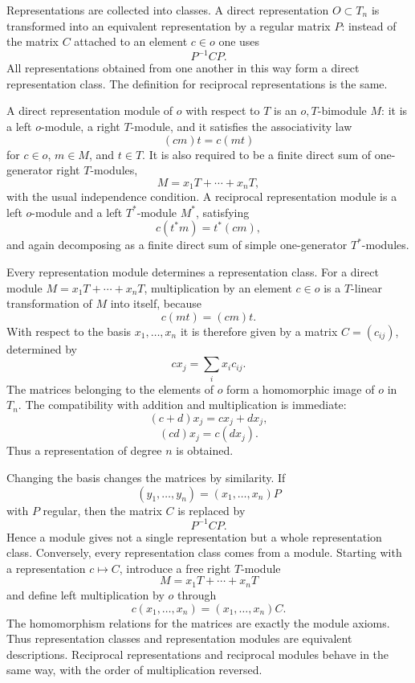 \documentclass[11pt]{article}
\begin{document}
Representations are collected into classes. A direct representation \(O\subset T_n\) is transformed into an equivalent representation by a regular matrix \(P\): instead of the matrix \(C\) attached to an element \(c\in o\) one uses
\[
  P^{-1}CP.
\]
All representations obtained from one another in this way form a direct representation class. The definition for reciprocal representations is the same.

A direct representation module of \(o\) with respect to \(T\) is an \(o,T\)-bimodule \(M\): it is a left \(o\)-module, a right \(T\)-module, and it satisfies the associativity law
\[
  (cm)t=c(mt)
\]
for \(c\in o\), \(m\in M\), and \(t\in T\). It is also required to be a finite direct sum of one-generator right \(T\)-modules,
\[
  M=x_1T+\cdots+x_nT,
\]
with the usual independence condition. A reciprocal representation module is a left \(o\)-module and a left \(T^*\)-module \(M^*\), satisfying
\[
  c(t^*m)=t^*(cm),
\]
and again decomposing as a finite direct sum of simple one-generator \(T^*\)-modules.

Every representation module determines a representation class. For a direct module \(M=x_1T+
\cdots+x_nT\), multiplication by an element \(c\in o\) is a \(T\)-linear transformation of \(M\) into itself, because
\[
  c(mt)=(cm)t.
\]
With respect to the basis \(x_1,
\ldots,x_n\) it is therefore given by a matrix \(C=(c_{ij})\), determined by
\[
  c x_j=\sum_i x_i c_{ij}.
\]
The matrices belonging to the elements of \(o\) form a homomorphic image of \(o\) in \(T_n\). The compatibility with addition and multiplication is immediate:
\[
  (c+d)x_j=cx_j+dx_j,
\]
\[
  (cd)x_j=c(dx_j).
\]
Thus a representation of degree \(n\) is obtained.

Changing the basis changes the matrices by similarity. If
\[
  (y_1,
\ldots,y_n)=(x_1,
\ldots,x_n)P
\]
with \(P\) regular, then the matrix \(C\) is replaced by
\[
  P^{-1}CP.
\]
Hence a module gives not a single representation but a whole representation class. Conversely, every representation class comes from a module. Starting with a representation \(c\mapsto C\), introduce a free right \(T\)-module
\[
  M=x_1T+
\cdots+x_nT
\]
and define left multiplication by \(o\) through
\[
  c(x_1,
\ldots,x_n)=(x_1,
\ldots,x_n)C.
\]
The homomorphism relations for the matrices are exactly the module axioms. Thus representation classes and representation modules are equivalent descriptions. Reciprocal representations and reciprocal modules behave in the same way, with the order of multiplication reversed.
\end{document}
